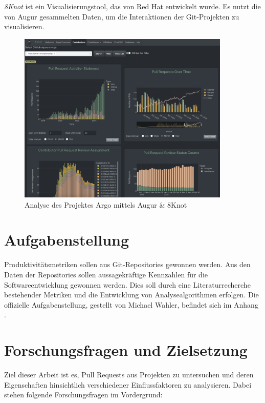 \textit{8Knot} ist ein Visualisierungstool, das von Red Hat entwickelt wurde. Es nutzt die von Augur gesammelten Daten, um die Interaktionen der Git-Projekten zu visualisieren.
\begin{figure}[htbp]
    \centering
    \includegraphics[width=0.9\textwidth]{Figures/augur-8knot.png}
    \caption{Analyse des Projektes Argo mittels Augur \& 8Knot \parencite{noauthor_metrixchaossio_nodate}}
    \label{fig:augur-8knot}
\end{figure}

\newpage


\section{Aufgabenstellung}
Produktivitätsmetriken sollen aus Git-Repositories gewonnen werden. Aus den Daten der Repositories sollen aussagekräftige Kennzahlen für die Softwareentwicklung gewonnen werden. Dies soll durch eine Literaturrecherche bestehender Metriken und die Entwicklung von Analysealgorithmen erfolgen.
Die offizielle Aufgabenstellung, gestellt von Michael Wahler, befindet sich im Anhang .

\section{Forschungsfragen und Zielsetzung}
\label{sec:Zielsetzung}

Ziel dieser Arbeit ist es, Pull Requests aus Projekten zu untersuchen und deren Eigenschaften hinsichtlich verschiedener Einflussfaktoren zu analysieren. Dabei stehen folgende Forschungsfragen im Vordergrund:

